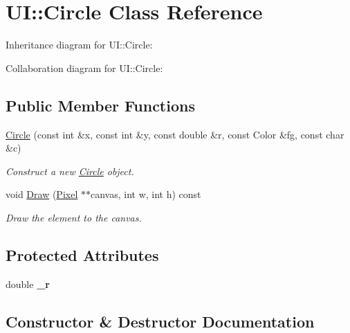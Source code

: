 \hypertarget{classUI_1_1Circle}{}\section{UI\+:\+:Circle Class Reference}
\label{classUI_1_1Circle}


Inheritance diagram for UI\+:\+:Circle\+:


Collaboration diagram for UI\+:\+:Circle\+:
\subsection*{Public Member Functions}
\begin{DoxyCompactItemize}
\item 
\hyperlink{classUI_1_1Circle_a87c196c051d08f610512fd3292aa59b1}{Circle} (const int \&x, const int \&y, const double \&r, const Color \&fg, const char \&c)
\begin{DoxyCompactList}\small\item\em Construct a new \hyperlink{classUI_1_1Circle}{Circle} object. \end{DoxyCompactList}\item 
void \hyperlink{classUI_1_1Circle_af7deb9b8a39ad8c33ffcc70e7b204deb}{Draw} (\hyperlink{classUI_1_1Pixel}{Pixel} $\ast$$\ast$canvas, int w, int h) const
\begin{DoxyCompactList}\small\item\em Draw the element to the canvas. \end{DoxyCompactList}\end{DoxyCompactItemize}
\subsection*{Protected Attributes}
\begin{DoxyCompactItemize}
\item 
\mbox{\label{classUI_1_1Circle_a8722076acca9d0652356a069c96cd696}} 
double {\bfseries \+\_\+r}
\end{DoxyCompactItemize}


\subsection{Constructor \& Destructor Documentation}
\mbox{\label{classUI_1_1Circle_a87c196c051d08f610512fd3292aa59b1}} 
